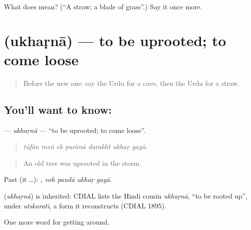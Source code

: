 \begin{tcolorbox}[breakable,colback=teal!4,colframe=teal!35!black,title={Before you move on}]
What does  mean? (\textquotedblleft{}A straw; a blade of grass\textquotedblright{}.) Say it once more.
\end{tcolorbox}
\section[\texorpdfstring{\ur{اکھڑنا} (ukhaṛnā)}{اکھڑنا (ukhaṛnā)}]{ (ukhaṛnā) — to be uprooted; to come loose}

\label{lesson:UR-C433-ukharna}



\begin{quote}
Before the new one: say the Urdu for a cave, then the Urdu for a straw.
\end{quote}

\subsection*{You'll want to know: }
\textbf{} — \emph{ukhaṛnā} — \textquotedblleft{}to be uprooted; to come loose\textquotedblright{}.

\begin{quote}
      
\end{quote}

\begin{quote}
\emph{tūfān meṅ ek purānā darakht ukhaṛ gayā.}
\end{quote}

\begin{quote}
An old tree was uprooted in the storm.
\end{quote}

Past (it …):    , \emph{voh paudā ukhaṛ gayā}.

\begin{cousinweb}
\textbf{} (\emph{ukhaṛnā}) is inherited: CDIAL lists the Hindi cousin \emph{ukhaṛnā}, \textquotedblleft{}to be rooted up\textquotedblright{}, under \emph{utskarati}, a form it reconstructs (CDIAL 1895).
\end{cousinweb}

\begin{grammarlens}[title={What you've built}]
One more word for getting around.
\end{grammarlens}

